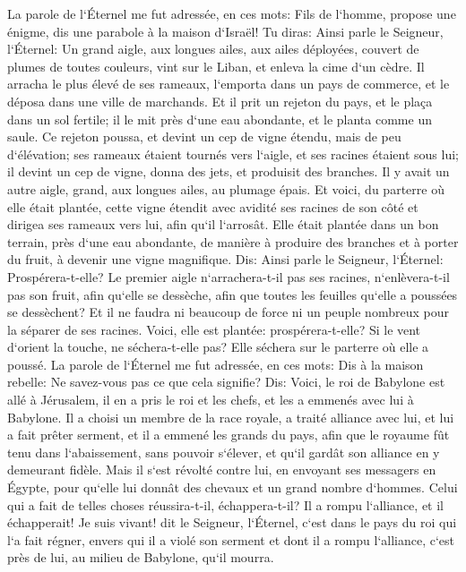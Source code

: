 \verse La parole de l`Éternel me fut adressée, en ces mots: 
\verse Fils de l`homme, propose une énigme, dis une parabole à la maison d`Israël! 
\verse Tu diras: Ainsi parle le Seigneur, l`Éternel: Un grand aigle, aux longues ailes, aux ailes déployées, couvert de plumes de toutes couleurs, vint sur le Liban, et enleva la cime d`un cèdre. 
\verse Il arracha le plus élevé de ses rameaux, l`emporta dans un pays de commerce, et le déposa dans une ville de marchands. 
\verse Et il prit un rejeton du pays, et le plaça dans un sol fertile; il le mit près d`une eau abondante, et le planta comme un saule. 
\verse Ce rejeton poussa, et devint un cep de vigne étendu, mais de peu d`élévation; ses rameaux étaient tournés vers l`aigle, et ses racines étaient sous lui; il devint un cep de vigne, donna des jets, et produisit des branches. 
\verse Il y avait un autre aigle, grand, aux longues ailes, au plumage épais. Et voici, du parterre où elle était plantée, cette vigne étendit avec avidité ses racines de son côté et dirigea ses rameaux vers lui, afin qu`il l`arrosât. 
\verse Elle était plantée dans un bon terrain, près d`une eau abondante, de manière à produire des branches et à porter du fruit, à devenir une vigne magnifique. 
\verse Dis: Ainsi parle le Seigneur, l`Éternel: Prospérera-t-elle? Le premier aigle n`arrachera-t-il pas ses racines, n`enlèvera-t-il pas son fruit, afin qu`elle se dessèche, afin que toutes les feuilles qu`elle a poussées se dessèchent? Et il ne faudra ni beaucoup de force ni un peuple nombreux pour la séparer de ses racines. 
\verse Voici, elle est plantée: prospérera-t-elle? Si le vent d`orient la touche, ne séchera-t-elle pas? Elle séchera sur le parterre où elle a poussé. 
\verse La parole de l`Éternel me fut adressée, en ces mots: 
\verse Dis à la maison rebelle: Ne savez-vous pas ce que cela signifie? Dis: Voici, le roi de Babylone est allé à Jérusalem, il en a pris le roi et les chefs, et les a emmenés avec lui à Babylone. 
\verse Il a choisi un membre de la race royale, a traité alliance avec lui, et lui a fait prêter serment, et il a emmené les grands du pays, 
\verse afin que le royaume fût tenu dans l`abaissement, sans pouvoir s`élever, et qu`il gardât son alliance en y demeurant fidèle. 
\verse Mais il s`est révolté contre lui, en envoyant ses messagers en Égypte, pour qu`elle lui donnât des chevaux et un grand nombre d`hommes. Celui qui a fait de telles choses réussira-t-il, échappera-t-il? Il a rompu l`alliance, et il échapperait! 
\verse Je suis vivant! dit le Seigneur, l`Éternel, c`est dans le pays du roi qui l`a fait régner, envers qui il a violé son serment et dont il a rompu l`alliance, c`est près de lui, au milieu de Babylone, qu`il mourra. 

